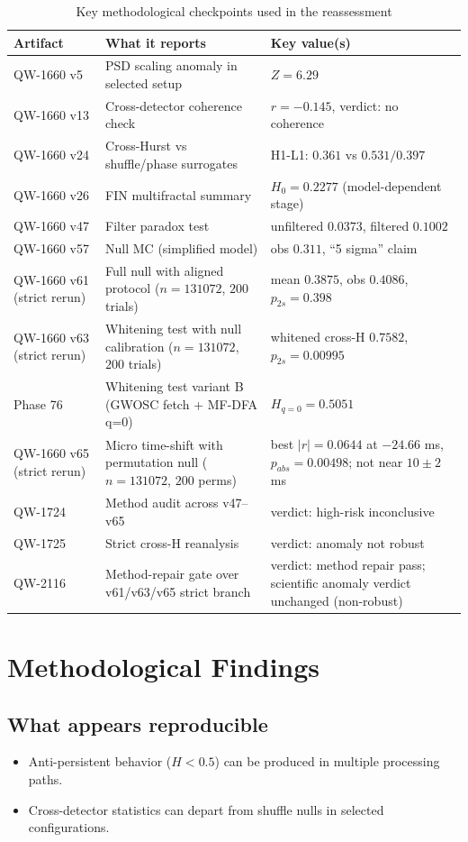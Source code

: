 \documentclass[11pt,a4paper]{article}
\begin{document}
\begin{longtable}{p{2.0cm}p{8.5cm}p{4.0cm}}
\caption{Key methodological checkpoints used in the reassessment}\label{tab:key_points}\\
\toprule
\textbf{Artifact} & \textbf{What it reports} & \textbf{Key value(s)} \\
\midrule
QW-1660 v5 & PSD scaling anomaly in selected setup & $Z=6.29$ \\
QW-1660 v13 & Cross-detector coherence check & $r=-0.145$, verdict: no coherence \\
QW-1660 v24 & Cross-Hurst vs shuffle/phase surrogates & H1-L1: $0.361$ vs $0.531/0.397$ \\
QW-1660 v26 & FIN multifractal summary & $H_0=0.2277$ (model-dependent stage) \\
QW-1660 v47 & Filter paradox test & unfiltered $0.0373$, filtered $0.1002$ \\
QW-1660 v57 & Null MC (simplified model) & obs $0.311$, ``5 sigma'' claim \\
QW-1660 v61 (strict rerun) & Full null with aligned protocol ($n=131072$, $200$ trials) & mean $0.3875$, obs $0.4086$, $p_{2s}=0.398$ \\
QW-1660 v63 (strict rerun) & Whitening test with null calibration ($n=131072$, $200$ trials) & whitened cross-H $0.7582$, $p_{2s}=0.00995$ \\
Phase 76 & Whitening test variant B (GWOSC fetch + MF-DFA q=0) & $H_{q=0}=0.5051$ \\
QW-1660 v65 (strict rerun) & Micro time-shift with permutation null ($n=131072$, $200$ perms) & best $|r|=0.0644$ at $-24.66$ ms, $p_{abs}=0.00498$; not near $10\pm2$ ms \\
QW-1724 & Method audit across v47--v65 & verdict: high-risk inconclusive \\
QW-1725 & Strict cross-H reanalysis & verdict: anomaly not robust \\
QW-2116 & Method-repair gate over v61/v63/v65 strict branch & verdict: method repair pass; scientific anomaly verdict unchanged (non-robust) \\
\bottomrule
\end{longtable}

\section{Methodological Findings}
\subsection{What appears reproducible}
\begin{itemize}[leftmargin=1.5em]
    \item Anti-persistent behavior ($H<0.5$) can be produced in multiple processing paths.
    \item Cross-detector statistics can depart from shuffle nulls in selected configurations.
\end{itemize}
\end{document}
